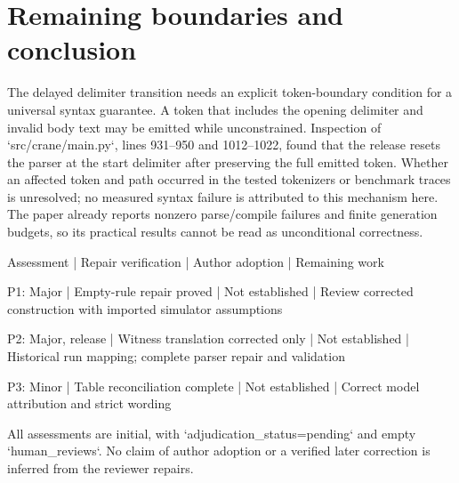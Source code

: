 \documentclass[10pt]{article}
\begin{document}
\section*{Remaining boundaries and conclusion}
The delayed delimiter transition needs an explicit token-boundary condition for a universal syntax guarantee. A token that includes the opening delimiter and invalid body text may be emitted while unconstrained. Inspection of `src/crane/main.py`, lines 931–950 and 1012–1022, found that the release resets the parser at the start delimiter after preserving the full emitted token. Whether an affected token and path occurred in the tested tokenizers or benchmark traces is unresolved; no measured syntax failure is attributed to this mechanism here. The paper already reports nonzero parse/compile failures and finite generation budgets, so its practical results cannot be read as unconditional correctness.\par
Assessment | Repair verification | Author adoption | Remaining work\par
P1: Major | Empty-rule repair proved | Not established | Review corrected construction with imported simulator assumptions\par
P2: Major, release | Witness translation corrected only | Not established | Historical run mapping; complete parser repair and validation\par
P3: Minor | Table reconciliation complete | Not established | Correct model attribution and strict wording\par
All assessments are initial, with `adjudication\_status=pending` and empty `human\_reviews`. No claim of author adoption or a verified later correction is inferred from the reviewer repairs.\par
\end{document}
